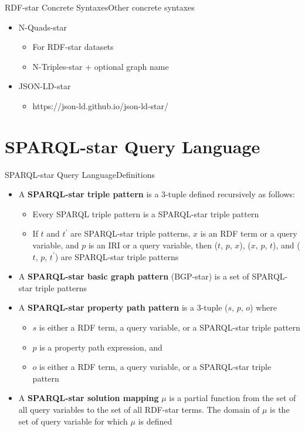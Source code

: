 \documentclass[aspectratio=169]{beamer}
\begin{document}
\begin{frame}{RDF-star Concrete Syntaxes}{Other concrete syntaxes}
    \begin{itemize}
        \item N-Quads-star
        \begin{itemize}
            \item For RDF-star datasets
            \item N-Triples-star + optional graph name
        \end{itemize}
        \item JSON-LD-star
        \begin{itemize}
            \item https://json-ld.github.io/json-ld-star/
        \end{itemize}
    \end{itemize}
\end{frame}

\section{SPARQL-star Query Language}
\begin{frame}{SPARQL-star Query Language}{Definitions}
    \begin{itemize}
        \item A \textbf{SPARQL-star triple pattern} is a 3-tuple defined recursively as follows:
        \begin{itemize}
            \item Every SPARQL triple pattern is a SPARQL-star triple pattern
            \item If $t$ and $t^{\prime}$ are SPARQL-star triple patterns, $x$ is an RDF term or a query variable, and $p$ is an IRI or a query variable, then ($t$, $p$, $x$), ($x$, $p$, $t$), and ($t$, $p$, $t^{\prime}$) are SPARQL-star triple patterns
        \end{itemize}
        \item A \textbf{SPARQL-star basic graph pattern} (BGP-star) is a set of SPARQL-star triple patterns
        \item A \textbf{SPARQL-star property path pattern} is a 3-tuple ($s$, $p$, $o$) where
            \begin{itemize}
                \item $s$ is either a RDF term, a query variable, or a SPARQL-star triple pattern
                \item $p$ is a property path expression, and
                \item $o$ is either a RDF term, a query variable, or a SPARQL-star triple pattern
            \end{itemize}
            \item A \textbf{SPARQL-star solution mapping} $\mu$ is a partial function from the set of all query variables to the set of all RDF-star terms. The domain of $\mu$ is the set of query variable for which $\mu$ is defined
    \end{itemize}
\end{frame}
\end{document}
